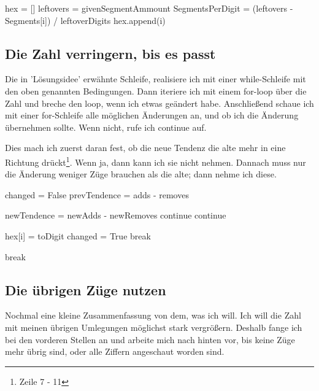 \documentclass[a4paper,10pt,ngerman]{scrartcl}
\begin{document}
\begin{algorithmic}[1]
\State hex = []
\State leftovers = givenSegmentAmmount
\State SegmentsPerDigit = (leftovers - Segments[i]) / leftoverDigits
\State hex.append(i)
\EndIf
\EndFor
\EndFor
\end{algorithmic}

\subsection{Die Zahl verringern, bis es passt}

Die in 'Lösungsidee' erwähnte Schleife, realisiere ich mit einer while-Schleife mit den oben genannten Bedingungen. Dann iteriere ich mit einem for-loop über die Zahl und breche den loop, wenn ich etwas geändert habe. Anschließend schaue ich mit einer for-Schleife alle möglichen Änderungen an, und ob ich die Änderung übernehmen sollte. Wenn nicht, rufe ich continue auf.

Dies mach ich zuerst daran fest, ob die neue Tendenz die alte mehr in eine Richtung drückt\footnote{Zeile 7 - 11}. Wenn ja, dann kann ich sie nicht nehmen. Dannach muss nur die Änderung weniger Züge brauchen als die alte; dann nehme ich diese.


\begin{algorithmic}[1]
\State changed = False
\State prevTendence = adds - removes

\State newTendence = newAdds - newRemoves
\State continue
\State continue
\EndIf

\State hex[i] = toDigit
\State changed = True
\State break
\EndIf

\EndFor

\State break
\EndIf
\EndFor

\EndWhile
\end{algorithmic}

\subsection{Die übrigen Züge nutzen}

Nochmal eine kleine Zusammenfassung von dem, was ich will. Ich will die Zahl mit meinen übrigen Umlegungen möglichst stark vergrößern. Deshalb fange ich bei den vorderen Stellen an und arbeite mich nach hinten vor, bis keine Züge mehr übrig sind, oder alle Ziffern angeschaut worden sind.
\end{document}
